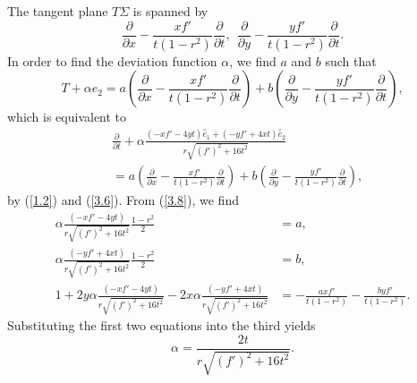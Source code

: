 \documentclass{amsart}
\theoremstyle{Corollary}
\numberwithin{equation}{section}
\begin{document}
The tangent plane $T\Sigma$ is spanned by 
$$\frac{\partial}{\partial x}-\frac{xf'}{t(1-r^2)}\frac{\partial}{\partial t},~~
\frac{\partial}{\partial y}-\frac{yf'}{t(1-r^2)}\frac{\partial}{\partial t}.$$
In order to find the deviation function $\alpha$, 
we find $a$ and $b$ such that 
\begin{equation}\label{3.8A}
T+\alpha e_2=a\left(\frac{\partial}{\partial x}-\frac{xf'}{t(1-r^2)}\frac{\partial}{\partial t}\right)
+b\left(\frac{\partial}{\partial y}-\frac{yf'}{t(1-r^2)}\frac{\partial}{\partial t}\right),
\end{equation}
which is equivalent to 
\begin{equation}\label{3.8}
\begin{split}
&\frac{\partial}{\partial t}+\alpha\frac{(-xf'-4yt)\overset{\circ}{e}_1
+(-yf'+4xt)\overset{\circ}{e}_2}
{r\sqrt{(f')^2+16t^2}}\\
&=a\left(\frac{\partial}{\partial x}-\frac{xf'}{t(1-r^2)}\frac{\partial}{\partial t}\right)
+b\left(\frac{\partial}{\partial y}-\frac{yf'}{t(1-r^2)}\frac{\partial}{\partial t}\right),
\end{split}
\end{equation}
by (\ref{1.2}) and (\ref{3.6}). 
From (\ref{3.8}), we find 
\begin{equation}\label{3.9A}
\begin{split}
\alpha\frac{(-xf'-4yt)}{r\sqrt{(f')^2+16t^2}}\frac{1-r^2}{2}&=a,\\
\alpha\frac{(-yf'+4xt)}{r\sqrt{(f')^2+16t^2}}\frac{1-r^2}{2}&=b,\\
1+2y\alpha\frac{(-xf'-4yt)}{r\sqrt{(f')^2+16t^2}}
-2x\alpha\frac{(-yf'+4xt)}{r\sqrt{(f')^2+16t^2}}&=-\frac{axf'}{t(1-r^2)}-\frac{byf'}{t(1-r^2)}.
\end{split}
\end{equation}
Substituting the first two equations into the third yields 
\begin{equation}\label{3.9}
\alpha=\frac{2t}{r\sqrt{(f')^2+16t^2}}.
\end{equation} 
\end{document}
